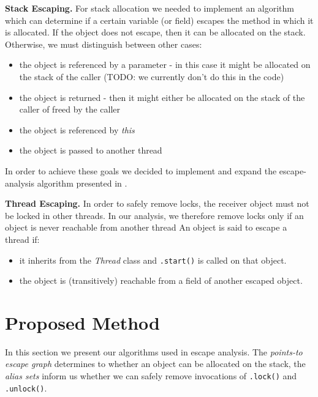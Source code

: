 \documentclass[letterpaper]{article}
\newcommand{\mypar}[1]{{\bf #1.}}
\begin{document}
\mypar{Stack Escaping} For stack allocation we needed to implement an algorithm which can determine
if a certain variable (or field) escapes the method in which it is allocated. If the object does not
escape, then it can be allocated on the stack. Otherwise, we must distinguish between other cases:
\begin{itemize}
  \item the object is referenced by a parameter - in this case it might be allocated on the stack
  of the caller (TODO: we currently don't do this in the code)
  \item the object is returned - then it might either be allocated on the stack of the caller of freed
  by the caller
  \item the object is referenced by \textit{this}
  \item the object is passed to another thread
\end{itemize}
In order to achieve these goals we decided to implement and expand the escape-analysis algorithm presented
in \cite{Whaley:99}.

\mypar{Thread Escaping} In order to safely remove locks, the receiver object must
not be locked in other threads. In our analysis, we therefore remove locks only
if an object is never reachable from another thread  An object is said to
escape a thread if:

\begin{itemize}
  \item it inherits from the \textit{Thread} class and \texttt{.start()} is called on that object.
  \item the object is (transitively) reachable from a field of another escaped object.
\end{itemize}

\section{Proposed Method}\label{sec:yourmethod}

In this section we present our algorithms used in escape analysis.
The \emph{points-to escape graph} determines to whether an object can
be allocated on the stack, the \emph{alias sets} inform us whether we can
safely remove invocations of \texttt{.lock()} and \texttt{.unlock()}.
\end{document}

